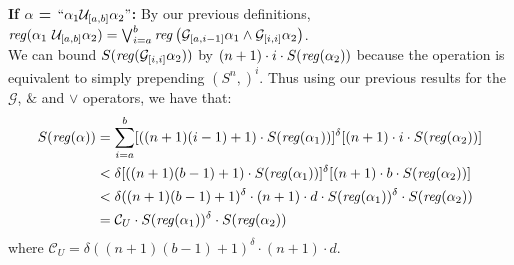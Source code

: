\documentclass[runningheads]{llncs}
\begin{document}
 \textbf{If $\alpha$ = $``\alpha_1 \mathcal{U}_{[a, b]} \alpha_2"$:}
    By our previous definitions, 
    $\text{\emph{reg}}(\alpha_1 \ \mathcal{U}_{[a,b]} \alpha_2) =  \bigvee_{i=a}^{b} \text{\emph{reg}}\left(\mathcal{G}_{[a,i-1]}\alpha_1 \land \mathcal{G}_{[i, i]} \alpha_2\right)$. \\
    We can bound $S(\text{\emph{reg}}(\mathcal{G}_{[i, i]} \alpha_2))$ by $(n+1) \cdot i \cdot S(\text{\emph{reg}}(\alpha_2))$ because the operation is equivalent to simply prepending $(S^n ,)^i$.
    Thus using our previous results for the $\mathcal{G}$, $\&$ and $\lor$ operators, we have that:
    \begin{align*}
        S(\text{\emph{reg}}(\alpha)) &= 
        \sum_{i = a}^b [((n+1)(i-1) + 1) \cdot S(\text{\emph{reg}}(\alpha_1))]^\delta 
        [(n+1) \cdot i \cdot S(\text{\emph{reg}}(\alpha_2))] \\
        &< \delta [((n+1)(b-1) + 1) \cdot S(\text{\emph{reg}}(\alpha_1))]^\delta 
        [(n+1) \cdot b \cdot S(\text{\emph{reg}}(\alpha_2))] \\
        &< \delta ((n+1)(b-1) + 1)^\delta \cdot (n+1) \cdot d \cdot S(\text{\emph{reg}}(\alpha_1))^\delta \cdot S(\text{\emph{reg}}(\alpha_2)) \\
        &= \mathcal{C}_U \cdot S(\text{\emph{reg}}(\alpha_1))^\delta \cdot S(\text{\emph{reg}}(\alpha_2))
    \end{align*}
    where $\mathcal{C}_U = \delta ((n+1)(b-1) + 1)^\delta \cdot (n+1) \cdot d$.
 
\end{document}

